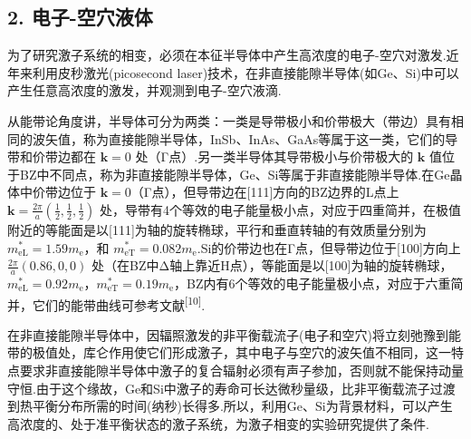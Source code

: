 \subsection*{2. 电子-空穴液体}

为了研究激子系统的相变，必须在本征半导体中产生高浓度的电子-空穴对激发.近年来利用皮秒激光(picosecond laser)技术，在非直接能隙半导体(如Ge、Si)中可以产生任意高浓度的激发，并观测到电子-空穴液滴.

从能带论角度讲，半导体可分为两类：一类是导带极小和价带极大（带边）具有相同的波矢值，称为直接能隙半导体，InSb、InAs、GaAs等属于这一类，它们的导带和价带边都在 $\boldsymbol{k}=0$ 处（Γ点）.另一类半导体其导带极小与价带极大的 $\boldsymbol{k}$ 值位于BZ中不同点，称为非直接能隙半导体，Ge、Si等属于非直接能隙半导体.在Ge晶体中价带边位于 $\boldsymbol{k}=0$（Γ点），但导带边在[111]方向的BZ边界的L点上 $\boldsymbol{k}=\frac{2\pi}{a}\left(\frac{1}{2},\frac{1}{2},\frac{1}{2}\right)$ 处，导带有4个等效的电子能量极小点，对应于四重简并，在极值附近的等能面是以[111]为轴的旋转椭球，平行和垂直转轴的有效质量分别为 $m_{\mathrm{eL}}^{*}=1.59m_{\mathrm{e}}$，和 $m_{\mathrm{eT}}^{*}=0.082m_{\mathrm{e}}$.Si的价带边也在Γ点，但导带边位于[100]方向上 $\frac{2\pi}{a}(0.86,0,0)$ 处（在BZ中Δ轴上靠近H点），等能面是以[100]为轴的旋转椭球，$m_{\mathrm{eL}}^{*}=0.92m_{\mathrm{e}}$，$m_{\mathrm{eT}}^{*}=0.19m_{\mathrm{e}}$，BZ内有6个等效的电子能量极小点，对应于六重简并，它们的能带曲线可参考文献\textsuperscript{[10]}.

在非直接能隙半导体中，因辐照激发的非平衡载流子(电子和空穴)将立刻弛豫到能带的极值处，库仑作用使它们形成激子，其中电子与空穴的波矢值不相同，这一特点要求非直接能隙半导体中激子的复合辐射必须有声子参加，否则就不能保持动量守恒.由于这个缘故，Ge和Si中激子的寿命可长达微秒量级，比非平衡载流子过渡到热平衡分布所需的时间(纳秒)长得多.所以，利用Ge、Si为背景材料，可以产生高浓度的、处于准平衡状态的激子系统，为激子相变的实验研究提供了条件.

